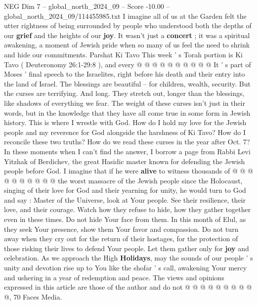 \begin{textsample}{NEG Dim 7 – global\_north\_2024\_09 – Score -10.00 – global\_north\_2024\_09/114455985.txt}
I imagine all of us at the Garden felt the utter rightness of being surrounded by people who understood both the depths of our \textbf{grief} and the heights of our \textbf{joy}.
It wasn't just a \textbf{concert} ; it was a spiritual awakening, a moment of Jewish pride when so many of us feel the need to shrink and hide our commitments.
Parshat Ki Tavo This week ' s Torah portion is Ki Tavo ( Deuteronomy 26:1-29:8 ), and every @ @ @ @ @ @ @ @ @ @ It ' s part of Moses ' final speech to the Israelites, right before his death and their entry into the land of Israel.
The blessings are beautiful -- for children, wealth, security.
But the curses are terrifying.
And long.
They stretch out, longer than the blessings, like shadows of everything we fear.
The weight of these curses isn't just in their words, but in the knowledge that they have all come true in some form in Jewish history.
This is where I wrestle with God.
How do I hold my love for the Jewish people and my reverence for God alongside the harshness of Ki Tavo?
How do I reconcile these two truths?
How do we read these curses in the year after Oct. 7?
In these moments when I can't find the answer, I borrow a page from Rabbi Levi Yitzhak of Berdichev, the great Hasidic master known for defending the Jewish people before God.
I imagine that if he were \textbf{alive} to witness thousands of @ @ @ @ @ @ @ @ @ @ the worst massacre of the Jewish people since the Holocaust, singing of their love for God and their yearning for unity, he would turn to God and say : Master of the Universe, look at Your people.
See their resilience, their love, and their courage.
Watch how they refuse to hide, how they gather together even in these times.
Do not hide Your face from them.
In this month of Elul, as they seek Your presence, show them Your favor and compassion.
Do not turn away when they cry out for the return of their hostages, for the protection of those risking their lives to defend Your people.
Let them gather only for \textbf{joy} and celebration.
As we approach the High \textbf{Holidays}, may the sounds of our people ' s unity and devotion rise up to You like the shofar ' s call, awakening Your mercy and ushering in a year of redemption and peace.
The views and opinions expressed in this article are those of the author and do not @ @ @ @ @ @ @ @ @ @, 70 Faces Media.

\end{textsample}
